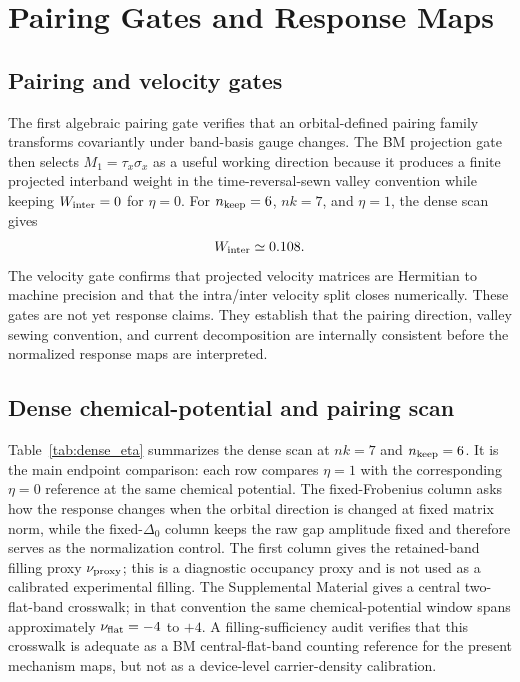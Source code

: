 \documentclass[aps,prb,reprint,superscriptaddress,floatfix,nofootinbib]{revtex4-2}
\begin{document}
\section{Pairing Gates and Response Maps}

\subsection{Pairing and velocity gates}

The first algebraic pairing gate verifies that an orbital-defined pairing
family transforms covariantly under band-basis gauge changes.
The BM projection gate then selects $M_1=\tau_x\sigma_x$ as a useful working
direction because it produces a finite projected interband weight in the
time-reversal-sewn valley convention while keeping $W_{\rm inter}=0$ for
$\eta=0$.
For $n_{\rm keep}=6$, $nk=7$, and $\eta=1$, the dense scan gives
\begin{equation}
  W_{\rm inter}\simeq 0.108.
\end{equation}
The velocity gate confirms that projected velocity matrices are Hermitian to
machine precision and that the intra/inter velocity split closes numerically.
These gates are not yet response claims.  They establish that the pairing
direction, valley sewing convention, and current decomposition are internally
consistent before the normalized response maps are interpreted.

\subsection{Dense chemical-potential and pairing scan}

Table~\ref{tab:dense_eta} summarizes the dense scan at $nk=7$ and
$n_{\rm keep}=6$.
It is the main endpoint comparison: each row compares $\eta=1$ with the
corresponding $\eta=0$ reference at the same chemical potential.
The fixed-Frobenius column asks how the response changes when the orbital
direction is changed at fixed matrix norm, while the fixed-$\Delta_0$ column
keeps the raw gap amplitude fixed and therefore serves as the normalization
control.
The first column gives the retained-band filling proxy $\nu_{\rm proxy}$; this
is a diagnostic occupancy proxy and is not used as a calibrated experimental
filling.  The Supplemental Material gives a central two-flat-band crosswalk;
in that convention the same chemical-potential window spans approximately
$\nu_{\rm flat}=-4$ to $+4$.
A filling-sufficiency audit verifies that this crosswalk is adequate as a BM
central-flat-band counting reference for the present mechanism maps, but not as
a device-level carrier-density calibration.
\end{document}
